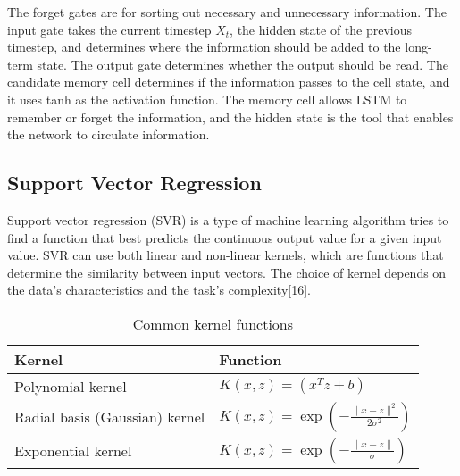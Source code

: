 \documentclass{ieeeojies}
\begin{document}
\indent The forget gates are for sorting out necessary and unnecessary information. The input gate takes the current timestep $X_t$, the hidden state of the previous timestep, and determines where the information should be added to the long-term state. The output gate determines whether the output should be read. The candidate memory cell determines if the information passes to the cell state, and it uses tanh as the activation function. The memory cell allows LSTM to remember or forget the information, and the hidden state is the tool that enables the network to circulate information.
\subsection{Support Vector Regression}
Support vector regression (SVR) is a type of machine learning algorithm tries to find a function that best predicts the continuous output value for a given input value. SVR can use both linear and non-linear kernels, which are functions that determine the similarity between input vectors. The choice of kernel depends on the data’s characteristics and the task’s complexity[16].

\begin{table}[H]
\caption{Common kernel functions}
\renewcommand{\arraystretch}{2}
\centering
\begin{tabular}{|l|l|}
\hline
\textbf{Kernel} & \textbf{Function} \\ \hline
Polynomial kernel & $K(x, z) = (x^T z + b)$ \\ \hline
Radial basis (Gaussian) kernel & $K(x, z) = \exp\left(-\frac{\|x - z\|^2}{2\sigma^2}\right)$ \\ \hline
Exponential kernel & $K(x, z) = \exp\left(-\frac{\|x - z\|}{\sigma}\right)$ \\ \hline
\end{tabular}

\end{table}
\end{document}
